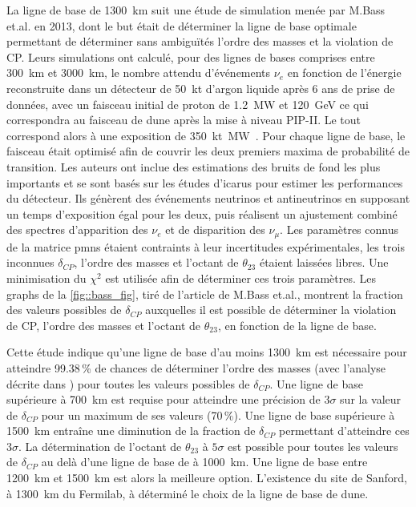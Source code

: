        La ligne de base de \SI{1300}{\kilo\meter} suit une étude de simulation menée par M.Bass et.al. en 2013\cite{Bass2013}, dont le but était de déterminer la ligne de base optimale permettant de déterminer sans ambiguïtés l'ordre des masses et la violation de CP. Leurs simulations ont calculé, pour des lignes de bases comprises entre \SI{300}{\kilo\meter} et \SI{3000}{\kilo\meter}, le nombre attendu d'événements $\nu_e$ en fonction de l'énergie reconstruite dans un détecteur de \SI{50}{\kilo\tonne} d'argon liquide après 6 ans de prise de données, avec un faisceau initial de proton de \SI{1.2}{\mega\watt} et \SI{120}{\giga\electronvolt} ce qui correspondra au faisceau de \gls{dune} après la mise à niveau PIP-II. Le tout correspond alors à une exposition de \SI{350}{\kilo\tonne\mega\watt\year}. Pour chaque ligne de base, le faisceau était optimisé afin de couvrir les deux premiers maxima de probabilité de transition. Les auteurs ont inclue des estimations des bruits de fond les plus importants et se sont basés sur les études d'\gls{icarus}\cite{ref_needed} pour estimer les performances du détecteur. Ils génèrent des événements neutrinos et antineutrinos en supposant un temps d'exposition égal pour les deux, puis réalisent un ajustement combiné des spectres d'apparition des $\nu_e$ et de disparition des $\nu_{\mu}$. Les paramètres connus de la matrice \gls{pmns} étaient contraints à leur incertitudes expérimentales, les trois inconnues $\delta_{CP}$, l'ordre des masses et l'octant de $\theta_{23}$ étaient laissées libres. Une minimisation du $\chi^2$ est utilisée afin de déterminer ces trois paramètres. Les graphs de la \autoref{fig::bass_fig}, tiré de l'article de M.Bass et.al., montrent la fraction des valeurs possibles de $\delta_{CP}$ auxquelles il est possible de déterminer la violation de CP, l'ordre des masses et l'octant de $\theta_{23}$, en fonction de la ligne de base.

        Cette étude indique qu'une ligne de base d'au moins \SI{1300}{\kilo\meter} est nécessaire pour atteindre 99.38\,\% de chances de déterminer l'ordre des masses (avec l'analyse décrite dans \cite{Qian2012}) pour toutes les valeurs possibles de $\delta_{CP}$. Une ligne de base supérieure à \SI{700}{\kilo\meter} est requise pour atteindre une précision de $3\sigma$ sur la valeur de $\delta_{CP}$ pour un maximum de ses valeurs (70\,\%). Une ligne de base supérieure à \SI{1500}{\kilo\meter} entraîne une diminution de la fraction de $\delta_{CP}$ permettant d'atteindre ces $3\sigma$. La détermination de l'octant de $\theta_{23}$ à $5\sigma$ est possible pour toutes les valeurs de $\delta_{CP}$ au delà d'une ligne de base de à \SI{1000}{\kilo\meter}. Une ligne de base entre \SI{1200}{\kilo\meter} et \SI{1500}{\kilo\meter} est alors la meilleure option. L'existence du site de Sanford, à \SI{1300}{\kilo\meter} du Fermilab, à déterminé le choix de la ligne de base de \gls{dune}.
        
